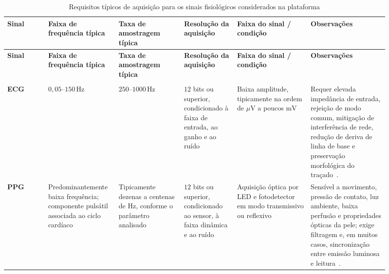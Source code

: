 \documentclass[a4paper,12pt]{fcte}
\begin{document}
\begin{landscape}
\footnotesize
\begin{longtable}{
  @{}
  >{\raggedright\arraybackslash}m{0.10\linewidth}
  >{\centering\arraybackslash}m{0.15\linewidth}
  >{\centering\arraybackslash}m{0.16\linewidth}
  >{\centering\arraybackslash}m{0.13\linewidth}
  >{\raggedright\arraybackslash}m{0.18\linewidth}
  >{\raggedright\arraybackslash}m{0.19\linewidth}
  @{}
}
    \caption{Requisitos típicos de aquisição para os sinais fisiológicos considerados na plataforma}
    \label{tab:req-sinais}\\

    \toprule
    \textbf{Sinal} &
    \textbf{Faixa de frequência típica} &
    \textbf{Taxa de amostragem típica} &
    \textbf{Resolução da aquisição} &
    \textbf{Faixa do sinal / condição} &
    \textbf{Observações} \\
    \midrule
    \endfirsthead

    \toprule
    \textbf{Sinal} &
    \textbf{Faixa de frequência típica} &
    \textbf{Taxa de amostragem típica} &
    \textbf{Resolução da aquisição} &
    \textbf{Faixa do sinal / condição} &
    \textbf{Observações} \\
    \midrule
    \endhead

    \multicolumn{6}{@{}l}{\textit{Sinais utilizados na avaliação experimental}}\\
    \midrule

    \textbf{ECG} &
    $0,05$--$150\,\text{Hz}$ &
    $250$--$1000\,\text{Hz}$ &
    $12$ bits ou superior, condicionado à faixa de entrada, ao ganho e ao ruído &
    Baixa amplitude, tipicamente na ordem de $\mu\text{V}$ a poucos $\text{mV}$ &
    Requer elevada impedância de entrada, rejeição de modo comum, mitigação de interferência de rede, redução de deriva de linha de base e preservação morfológica do traçado~\cite{ardeti2023ecg,chu2023ecgsystem,raus2025ecg_testing}. \\

    \textbf{PPG} &
    Predominantemente baixa frequência; componente pulsátil associada ao ciclo cardíaco &
    Tipicamente dezenas a centenas de Hz, conforme o parâmetro analisado &
    $12$ bits ou superior, condicionado ao sensor, à faixa dinâmica e ao ruído &
    Aquisição óptica por LED e fotodetector em modo transmissivo ou reflexivo &
    Sensível a movimento, pressão de contato, luz ambiente, baixa perfusão e propriedades ópticas da pele; exige filtragem e, em muitos casos, sincronização entre emissão luminosa e leitura~\cite{charlton2022wearable_ppg,beres2021ppg_sampling}. \\


\end{longtable}
\end{landscape}
\end{document}
